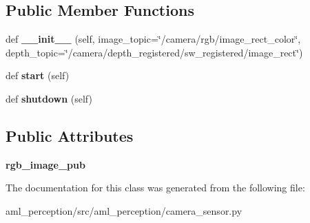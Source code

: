 \subsection*{Public Member Functions}
\begin{DoxyCompactItemize}
\item 
\hypertarget{classaml__perception_1_1camera__sensor_1_1_camera_sensor_a315c3e91762a38dbf8ecd07f30e099f1}{}\label{classaml__perception_1_1camera__sensor_1_1_camera_sensor_a315c3e91762a38dbf8ecd07f30e099f1} 
def {\bfseries \+\_\+\+\_\+init\+\_\+\+\_\+} (self, image\+\_\+topic=\char`\"{}/camera/rgb/image\+\_\+rect\+\_\+color\char`\"{}, depth\+\_\+topic=\char`\"{}/camera/depth\+\_\+registered/sw\+\_\+registered/image\+\_\+rect\char`\"{})
\item 
\hypertarget{classaml__perception_1_1camera__sensor_1_1_camera_sensor_a5967f87a0f03eb4dfbabd049921595b4}{}\label{classaml__perception_1_1camera__sensor_1_1_camera_sensor_a5967f87a0f03eb4dfbabd049921595b4} 
def {\bfseries start} (self)
\item 
\hypertarget{classaml__perception_1_1camera__sensor_1_1_camera_sensor_aec9d980f6d93b1df114ceebba4266dfc}{}\label{classaml__perception_1_1camera__sensor_1_1_camera_sensor_aec9d980f6d93b1df114ceebba4266dfc} 
def {\bfseries shutdown} (self)
\end{DoxyCompactItemize}
\subsection*{Public Attributes}
\begin{DoxyCompactItemize}
\item 
\hypertarget{classaml__perception_1_1camera__sensor_1_1_camera_sensor_af2ce3908d0143e32e9bc38d087440873}{}\label{classaml__perception_1_1camera__sensor_1_1_camera_sensor_af2ce3908d0143e32e9bc38d087440873} 
{\bfseries rgb\+\_\+image\+\_\+pub}
\end{DoxyCompactItemize}


The documentation for this class was generated from the following file\+:\begin{DoxyCompactItemize}
\item 
aml\+\_\+perception/src/aml\+\_\+perception/camera\+\_\+sensor.\+py\end{DoxyCompactItemize}
